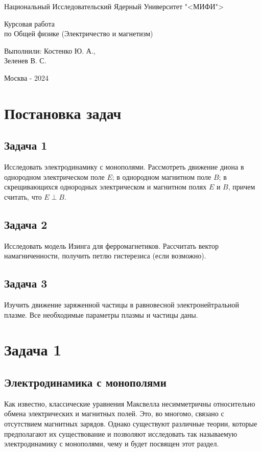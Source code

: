 \documentclass[oneside,final,14pt]{extarticle}
\begin{document}
	\begin{titlepage}
		\centerline{Национальный Исследовательский Ядерный Университет "<МИФИ">}
		\vfill
		\Large
		\begin{center}
			Курсовая работа\\ по Общей физике (Электричество и магнетизм)
		\end{center}
		\normalsize
		\vfill
		\begin{flushright}
			Выполнили: Костенко Ю. А., \\ Зеленев В. С.
		\end{flushright}
		\vfill \vfill \vfill
		\centerline{Москва - 2024}
	\end{titlepage}
	\setcounter{page}{2}
	\tableofcontents
	\newpage
	
	\section{Постановка задач}
	\subsection{Задача 1}
	Исследовать электродинамику с монополями. Рассмотреть движение диона в однородном электрическом поле $E$; в однородном магнитном поле $B$; в скрещивающихся однородных электрическом и магнитном полях $E$ и $B$, причем считать, что $E \perp B$.
	\subsection{Задача 2}
	Исследовать модель Изинга для ферромагнетиков. Рассчитать вектор намагниченности, получить петлю гистерезиса (если возможно). 
	\subsection{Задача 3}
	Изучить движение заряженной частицы в равновесной электронейтральной плазме. Все необходимые параметры плазмы и частицы даны. 
	\newpage
	
	\section{Задача 1}
	\subsection{Электродинамика с монополями}
	Как известно, классические уравнения Максвелла несимметричны относительно обмена электрических и магнитных полей. Это, во многомо, связано с отсутствием магнитных зарядов. Однако существуют различные теории, которые предполагают их существование и позволяют исследовать так называемую электродинамику с монополями, чему и будет посвящен этот раздел. 
\end{document}
